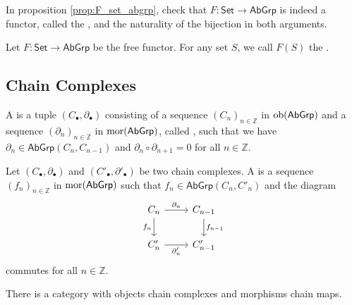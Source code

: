 \begin{exercise}
	In proposition \ref{prop:F_set_abgrp}, check that $F : \mathsf{Set} \to \mathsf{AbGrp}$ is indeed a functor, called the , and the naturality of the bijection in both arguments. 
\end{exercise}

\begin{definition}
	Let $F : \mathsf{Set} \to \mathsf{AbGrp}$ be the free functor. For any set $S$, we call $F(S)$ the .
\end{definition}

\subsection*{Chain Complexes}

\begin{definition}
	A  is a tuple $(C_\bullet,\partial_\bullet)$ consisting of a sequence $(C_n)_{n \in \mathbb{Z}}$ in $\operatorname{ob}(\mathsf{AbGrp})$ and a sequence $(\partial_n)_{n \in \mathbb{Z}}$ in $\operatorname{mor}(\mathsf{AbGrp})$, called , such that we have $\partial_{n} \in \mathsf{AbGrp}(C_n,C_{n - 1})$ and $\partial_n \circ \partial_{n + 1} = 0$ for all $n \in \mathbb{Z}$.
\end{definition}

\begin{definition}
	Let $(C_\bullet,\partial_\bullet)$ and $(C'_\bullet,\partial'_\bullet)$ be two chain complexes. A  is a sequence $(f_n)_{n \in \mathbb{Z}}$ in $\operatorname{mor}(\mathsf{AbGrp})$ such that $f_n \in \mathsf{AbGrp}(C_n,C'_n)$ and the diagram
	\begin{equation*}
		\begin{tikzcd}
			C_n \arrow[r,"\partial_n"]\arrow[d,"f_n"'] & C_{n - 1} \arrow[d,"f_{n - 1}"] \\
			C'_n \ar[r,"\partial'_n"'] & C'_{n - 1}
		\end{tikzcd}
	\end{equation*}
	\noindent commutes for all $n \in \mathbb{Z}$.
\end{definition}

\begin{proposition}
	There is a category with objects chain complexes and morphisms chain maps.
	\label{prop:comp}
\end{proposition}

